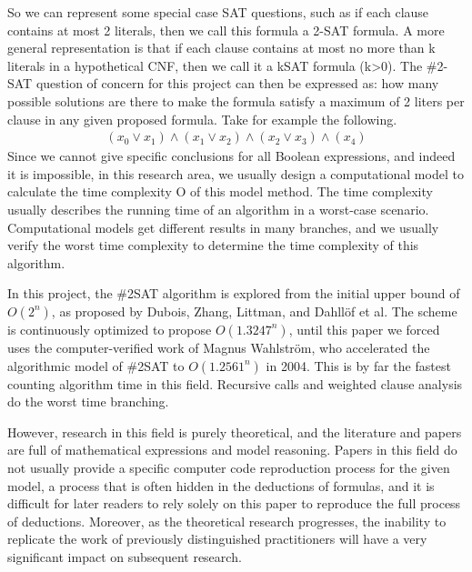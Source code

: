 \documentclass{sigchi}
\begin{document}
So we can represent some special case SAT questions, such as if each clause contains at most 2 literals, then we call this formula a 2-SAT formula. A more general representation is that if each clause contains at most no more than k literals in a hypothetical CNF, then we call it a k\-SAT formula (k>0). The \#2-SAT question of concern for this project can then be expressed as: how many possible solutions are there to make the formula satisfy a maximum of 2 liters per clause in any given proposed formula. Take for example the following.
\begin{align*}  
\left ( x_{0}\vee x_{1} \right )\wedge \left ( x_{1}\vee x_{2} \right )\wedge \left ( x_{2}\vee  x_{3} \right )\wedge \left ( x_{4}\right )
\end{align*}
Since we cannot give specific conclusions for all Boolean expressions, and indeed it is impossible, in this research area, we usually design a computational model to calculate the time complexity O of this model method. The time complexity usually describes the running time of an algorithm in a worst-case scenario. Computational models get different results in many branches, and we usually verify the worst time complexity to determine the time complexity of this algorithm.

In this project, the \#2SAT algorithm is explored from the initial upper bound of $ O\left ( 2^{n} \right )$, as proposed by Dubois, Zhang, Littman, and Dahllöf\cite{10.1007/3-540-45655-4_57} et al. The scheme is continuously optimized to propose $ O\left ( 1.3247^{n} \right )$, until this paper we forced uses the computer-verified work of Magnus Wahlström, who accelerated the algorithmic model of \#2SAT to $ O\left ( 1.2561^{n} \right )$ in 2004\cite{10.1016/j.tcs.2004.10.037}. This is by far the fastest counting algorithm time in this field. Recursive calls and weighted clause analysis do the worst time branching.

However, research in this field is purely theoretical, and the literature and papers are full of mathematical expressions and model reasoning. Papers in this field do not usually provide a specific computer code reproduction process for the given model, a process that is often hidden in the deductions of formulas, and it is difficult for later readers to rely solely on this paper to reproduce the full process of deductions. Moreover, as the theoretical research progresses, the inability to replicate the work of previously distinguished practitioners will have a very significant impact on subsequent research.
\end{document}
